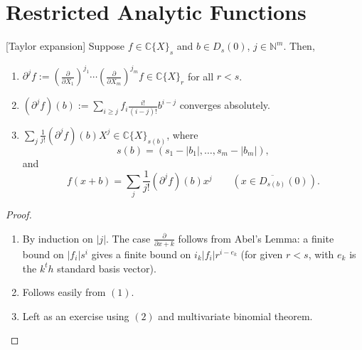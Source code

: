 \section{Restricted Analytic Functions}

\begin{lemma}\label{11.1}[Taylor expansion] Suppose $f\in \mathds{C}\{X\}_s$ and $b\in D_s(0)$, $j\in \mathds{N}^m$.  Then,
\begin{enumerate}[(1)]
\item $\partial^j f :=\left (\frac{\partial}{\partial X_1} \right )^{j_1} \cdots \left (\frac{\partial}{\partial X_m} \right )^{j_m}f\in \mathds{C}\{X\}_r$ for all $r<s$.
\item $(\partial^jf)(b):= \sum_{i\geq j} f_i \frac{i!}{(i-j)!}b^{i-j}$ converges absolutely.  
\item $\sum_j \frac{1}{j!} (\partial^jf)(b)X^j\in \mathds{C}\{X\}_{s(b)}$, where
$$s(b)=(s_1-|b_1|, \dots, s_m-|b_m|),$$
and
$$f(x+b) = \sum_j\frac{1}{j!}(\partial^jf)(b)x^j \qquad (x\in \overline{D_{s(b)}}(0)).$$
\end{enumerate}
\end{lemma}

\begin{proof} \begin{enumerate}[(1)]
\item By induction on $|j|$.  The case $\frac{\partial}{\partial x+k}$ follows from Abel's Lemma: a finite bound on $|f_i|s^i$ gives a finite bound on $i_k|f_i|r^{i-e_k}$ (for given $r<s$, with $e_k$ is the $k^th$ standard basis vector).  
\item Follows easily from $(1)$.
\item Left as an exercise using $(2)$ and multivariate binomial theorem. 
\end{enumerate}\end{proof}

